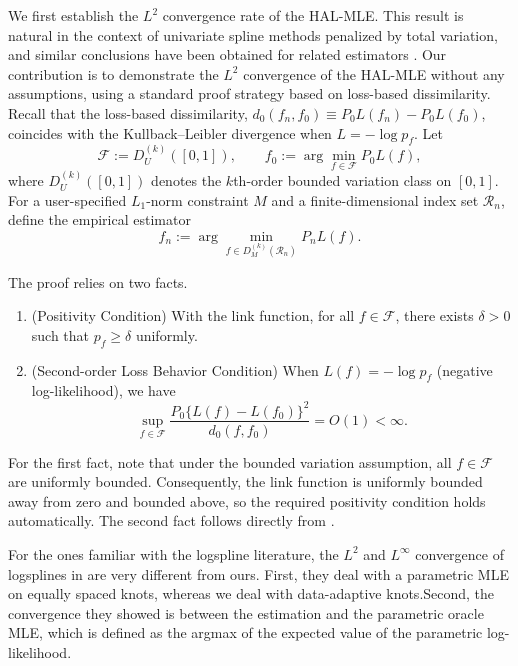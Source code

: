 We first establish the $L^2$ convergence rate of the HAL-MLE. This result is natural in the context of univariate spline methods penalized by total variation, 
and similar conclusions have been obtained for related estimators 
\citep{mammen1997locally, tibshirani2014adaptive, bak2021penalized}. 
Our contribution is to demonstrate the $L^2$ convergence of the HAL-MLE without any assumptions, 
using a standard proof strategy based on loss-based dissimilarity. 
Recall that the loss-based dissimilarity, $d_{0}(f_{n},f_{0}) \equiv P_0{L(f_n)} - P_0{L(f_0)}$, coincides with the Kullback--Leibler divergence when $L = -\log p_f$. 
Let
\[
\mathcal F := D^{(k)}_U([0,1]), 
\qquad 
f_{0} := \arg\min_{f \in \mathcal F} P_{0}L(f),
\]
where $D^{(k)}_U([0,1])$ denotes the $k$th-order bounded variation class on $[0,1]$. 
For a user-specified $L_1$-norm constraint $M$ and a finite-dimensional index set $\mathcal{R}_n$, 
define the empirical estimator
\[
f_{n} := \arg\min_{f \in D^{(k)}_M(\mathcal{R}_n)} P_{n}L(f).
\]

The proof relies on two facts.  
\begin{enumerate}
  \item (Positivity Condition) With the link function, for all $f \in \mathcal F$, there exists $\delta > 0$ such that $p_f \geq \delta$ uniformly.
  \item (Second-order Loss Behavior Condition) When $L(f) = -\log p_f$ (negative log-likelihood), we have
  \[
  \sup_{f \in \mathcal F} 
  \frac{P_{0}\!\bigl\{L(f) - L(f_{0})\bigr\}^{2}}{d_{0}(f,f_{0})}
  = O(1) < \infty.
  \]
\end{enumerate}

\begin{remark}
For the first fact, note that under the bounded variation assumption, all 
$f \in \mathcal F$ are uniformly bounded. Consequently, the link function is 
uniformly bounded away from zero and bounded above, so the required positivity 
condition holds automatically. The second fact follows directly from 
\citet{van2004asymptotic}.
\end{remark}

\begin{remark} \label{remark:logspline-convergence}
For the ones familiar with the logspline literature, the $L^2$ and $L^{\infty}$ convergence of logsplines in \citet{stone1990large} are very different from ours. First, they deal with a parametric MLE on equally spaced knots, whereas we deal with data-adaptive knots.Second, the convergence they showed is between the estimation and the parametric oracle MLE, which is defined as the argmax of the expected value of the parametric log-likelihood.
\end{remark}

